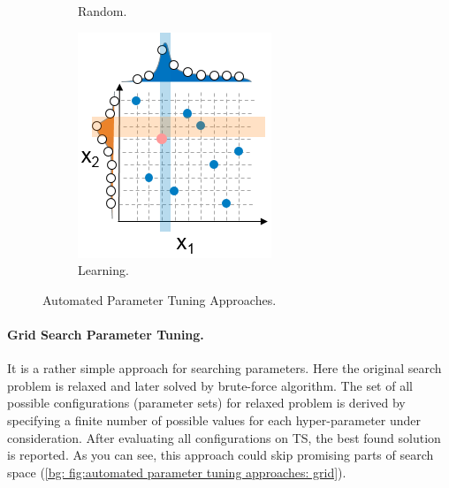 \begin{figure}
\begin{subfigure}[b]{0.25\linewidth}
		\caption{Random.}
		\label{bg: fig:automated parameter tuning approaches: random}
	\end{subfigure}
	\begin{subfigure}[b]{0.25\linewidth}
		\includegraphics[width=\linewidth]{graphics/Background/hyperparameter-learning-search.png}
		\caption{Learning.}
		\label{bg: fig:automated parameter tuning approaches: learning}
	\end{subfigure}
	\caption{Automated Parameter Tuning Approaches.}
	\label{bg: fig:automated parameter tuning approaches}
\end{figure}

\paragraph{Grid Search Parameter Tuning.} It is a rather simple approach for searching parameters. Here the original search problem is relaxed and later solved by brute-force algorithm. The set of all possible configurations (parameter sets) for relaxed problem is derived by specifying a finite number of possible values for each hyper-parameter under consideration. After evaluating all configurations on TS, the best found solution is reported. As you can see, this approach could skip promising parts of search space (\cref{bg: fig:automated parameter tuning approaches: grid}).

